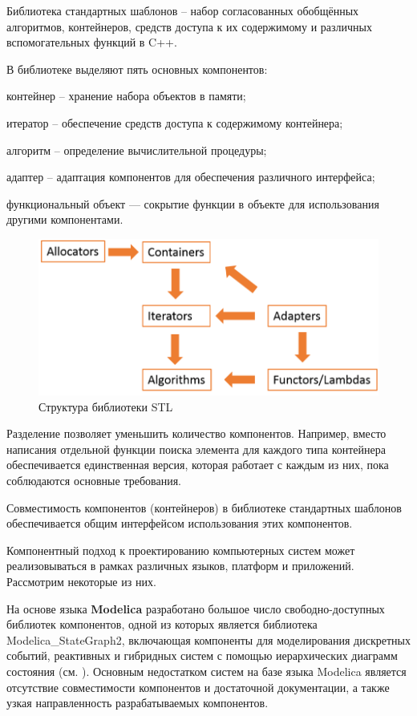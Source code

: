 Библиотека стандартных шаблонов -- набор согласованных обобщённых алгоритмов, контейнеров, средств доступа к их содержимому и различных вспомогательных функций в C++.

В библиотеке выделяют пять основных компонентов:
\begin{textitemize}
	\item контейнер -- хранение набора объектов в памяти;
	\item итератор -- обеспечение средств доступа к содержимому контейнера;
	\item алгоритм -- определение вычислительной процедуры;
	\item адаптер -- адаптация компонентов для обеспечения различного интерфейса;
	\item функциональный объект — сокрытие функции в объекте для использования другими компонентами.
\end{textitemize}

\begin{figure}[H]
	\includegraphics[scale=0.7]{author/part5/figures/STL.png}
	\caption{Структура библиотеки STL}
	\label{fig:STL}
\end{figure}

Разделение позволяет уменьшить количество компонентов. Например, вместо написания отдельной функции поиска элемента для каждого типа контейнера обеспечивается единственная версия, которая работает с каждым из них, пока соблюдаются основные требования.

Совместимость компонентов (контейнеров) в библиотеке стандартных шаблонов обеспечивается общим интерфейсом использования этих компонентов.

Компонентный подход к проектированию компьютерных систем может реализовываться в рамках различных языков, платформ и приложений. Рассмотрим некоторые из них.

На основе языка \textbf{Modelica} разработано большое число свободно-доступных библиотек компонентов, одной из которых является библиотека Modelica\_StateGraph2, включающая компоненты для моделирования дискретных событий, реактивных и гибридных систем с помощью иерархических диаграмм состояния (см. ). Основным недостатком систем на базе языка Modelica является отсутствие совместимости компонентов и достаточной документации, а также узкая направленность разрабатываемых компонентов.

